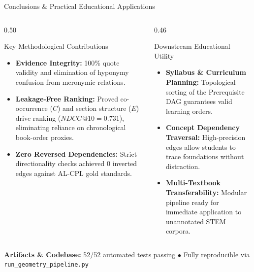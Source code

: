 \documentclass[aspectratio=169,10pt]{beamer}
\begin{document}
\begin{frame}{Conclusions \& Practical Educational Applications}
    \begin{columns}[T]
        \begin{column}{0.50\textwidth}
            \begin{block}{Key Methodological Contributions}
                \begin{itemize}
                    \item \textbf{Evidence Integrity:} 100\% quote validity and elimination of hyponymy confusion from meronymic relations.
                    \item \textbf{Leakage-Free Ranking:} Proved co-occurrence ($C$) and section structure ($E$) drive ranking ($NDCG@10 = 0.731$), eliminating reliance on chronological book-order proxies.
                    \item \textbf{Zero Reversed Dependencies:} Strict directionality checks achieved 0 inverted edges against AL-CPL gold standards.
                \end{itemize}
            \end{block}
        \end{column}

        \begin{column}{0.46\textwidth}
            \begin{exampleblock}{Downstream Educational Utility}
                \begin{itemize}
                    \item \textbf{Syllabus \& Curriculum Planning:} Topological sorting of the Prerequisite DAG guarantees valid learning orders.
                    \item \textbf{Concept Dependency Traversal:} High-precision edges allow students to trace foundations without distraction.
                    \item \textbf{Multi-Textbook Transferability:} Modular pipeline ready for immediate application to unannotated STEM corpora.
                \end{itemize}
            \end{exampleblock}
        \end{column}
    \end{columns}

    \vspace{0.4cm}
    \centering
    \footnotesize
    \textbf{Artifacts \& Codebase:} 52/52 automated tests passing $\bullet$ Fully reproducible via \texttt{run\_geometry\_pipeline.py}
\end{frame}
\end{document}
